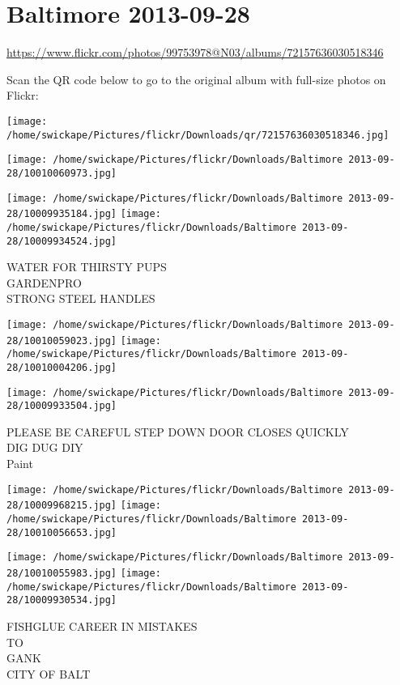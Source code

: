 \documentclass[10pt,letterpaper]{article}
\begin{document}
\section*{Baltimore 2013-09-28}

\url{https://www.flickr.com/photos/99753978@N03/albums/72157636030518346}

Scan the QR code below to go to the original album with full-size photos on Flickr:

\texttt{[image: /home/swickape/Pictures/flickr/Downloads/qr/72157636030518346.jpg]}
\pagebreak

\texttt{[image: /home/swickape/Pictures/flickr/Downloads/Baltimore 2013-09-28/10010060973.jpg]}

\vspace{0.25in}
\texttt{[image: /home/swickape/Pictures/flickr/Downloads/Baltimore 2013-09-28/10009935184.jpg]}
\texttt{[image: /home/swickape/Pictures/flickr/Downloads/Baltimore 2013-09-28/10009934524.jpg]}

WATER FOR THIRSTY PUPS\\
GARDENPRO\\
STRONG STEEL HANDLES
\pagebreak

\texttt{[image: /home/swickape/Pictures/flickr/Downloads/Baltimore 2013-09-28/10010059023.jpg]}
\texttt{[image: /home/swickape/Pictures/flickr/Downloads/Baltimore 2013-09-28/10010004206.jpg]}

\vspace{0.25in}
\texttt{[image: /home/swickape/Pictures/flickr/Downloads/Baltimore 2013-09-28/10009933504.jpg]}

PLEASE BE CAREFUL STEP DOWN DOOR CLOSES QUICKLY\\
DIG DUG DIY\\
Paint
\pagebreak

\texttt{[image: /home/swickape/Pictures/flickr/Downloads/Baltimore 2013-09-28/10009968215.jpg]}
\texttt{[image: /home/swickape/Pictures/flickr/Downloads/Baltimore 2013-09-28/10010056653.jpg]}

\texttt{[image: /home/swickape/Pictures/flickr/Downloads/Baltimore 2013-09-28/10010055983.jpg]}
\texttt{[image: /home/swickape/Pictures/flickr/Downloads/Baltimore 2013-09-28/10009930534.jpg]}

FISHGLUE CAREER IN MISTAKES\\
TO\\
GANK\\
CITY OF BALT
\pagebreak
\end{document}
